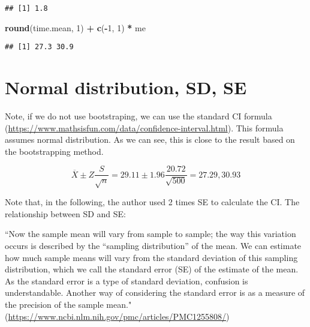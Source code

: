 \documentclass[]{book}
\newenvironment{Shaded}{\begin{snugshade}}{\end{snugshade}}
\newcommand{\DecValTok}[1]{\textcolor[rgb]{0.00,0.00,0.81}{#1}}
\newcommand{\KeywordTok}[1]{\textcolor[rgb]{0.13,0.29,0.53}{\textbf{#1}}}
\newcommand{\NormalTok}[1]{#1}
\newcommand{\OperatorTok}[1]{\textcolor[rgb]{0.81,0.36,0.00}{\textbf{#1}}}
\newcommand{\StringTok}[1]{\textcolor[rgb]{0.31,0.60,0.02}{#1}}
\begin{document}
\begin{verbatim}
## [1] 1.8
\end{verbatim}

\begin{Shaded}
\begin{Highlighting}[]
\KeywordTok{round}\NormalTok{(time.mean, }\DecValTok{1}\NormalTok{) }\OperatorTok{+}\StringTok{ }\KeywordTok{c}\NormalTok{(}\OperatorTok{-}\DecValTok{1}\NormalTok{, }\DecValTok{1}\NormalTok{) }\OperatorTok{*}\StringTok{ }\NormalTok{me}
\end{Highlighting}
\end{Shaded}

\begin{verbatim}
## [1] 27.3 30.9
\end{verbatim}

\hypertarget{normal-distribution-sd-se}{%
\section{Normal distribution, SD, SE}\label{normal-distribution-sd-se}}

Note, if we do not use bootstraping, we can use the standard CI formula (\url{https://www.mathsisfun.com/data/confidence-interval.html}). This formula assumes normal distribution. As we can see, this is close to the result based on the bootstrapping method.

\[\overline{X} \pm Z \frac{S}{\sqrt{n}}=29.11 \pm 1.96 \frac{20.72}{\sqrt{500}}=27.29, 30.93\]

Note that, in the following, the author used 2 times SE to calculate the CI. The relationship between SD and SE:

``Now the sample mean will vary from sample to sample; the way this variation occurs is described by the ``sampling distribution'' of the mean. We can estimate how much sample means will vary from the standard deviation of this sampling distribution, which we call the standard error (SE) of the estimate of the mean. As the standard error is a type of standard deviation, confusion is understandable. Another way of considering the standard error is as a measure of the precision of the sample mean." (\url{https://www.ncbi.nlm.nih.gov/pmc/articles/PMC1255808/})
\end{document}
